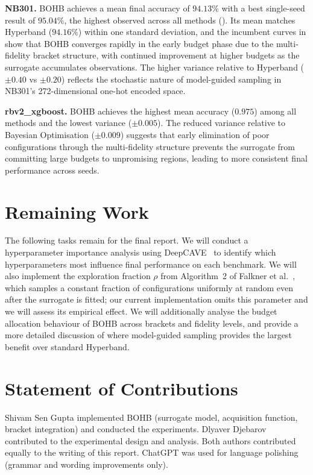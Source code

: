 \documentclass[review]{AIM_report}
\begin{document}
\textbf{NB301.} BOHB achieves a mean final accuracy of $94.13\%$ with a best single-seed result of $95.04\%$, the highest observed across all methods (). Its mean matches Hyperband ($94.16\%$) within one standard deviation, and the incumbent curves in  show that BOHB converges rapidly in the early budget phase due to the multi-fidelity bracket structure, with continued improvement at higher budgets as the surrogate accumulates observations. The higher variance relative to Hyperband ($\pm 0.40$ vs $\pm 0.20$) reflects the stochastic nature of model-guided sampling in NB301's 272-dimensional one-hot encoded space.

\textbf{rbv2\_xgboost.} BOHB achieves the highest mean accuracy ($0.975$) among all methods and the lowest variance ($\pm 0.005$). The reduced variance relative to Bayesian Optimisation ($\pm 0.009$) suggests that early elimination of poor configurations through the multi-fidelity structure prevents the surrogate from committing large budgets to unpromising regions, leading to more consistent final performance across seeds.

\section{Remaining Work}

The following tasks remain for the final report. We will conduct a hyperparameter importance analysis using DeepCAVE~\cite{lindauer2022deepcave} to identify which hyperparameters most influence final performance on each benchmark. We will also implement the exploration fraction $\rho$ from Algorithm~2 of Falkner et al.~\cite{falkner2018bohb}, which samples a constant fraction of configurations uniformly at random even after the surrogate is fitted; our current implementation omits this parameter and we will assess its empirical effect. We will additionally analyse the budget allocation behaviour of BOHB across brackets and fidelity levels, and provide a more detailed discussion of where model-guided sampling provides the largest benefit over standard Hyperband.

\section*{Statement of Contributions}

Shivam Sen Gupta implemented BOHB (surrogate model, acquisition function, bracket integration) and conducted the experiments. Dlyaver Djebarov contributed to the experimental design and analysis. Both authors contributed equally to the writing of this report. ChatGPT was used for language polishing (grammar and wording improvements only).

\printbibliography

\newpage
\pagestyle{empty}


\end{document}
